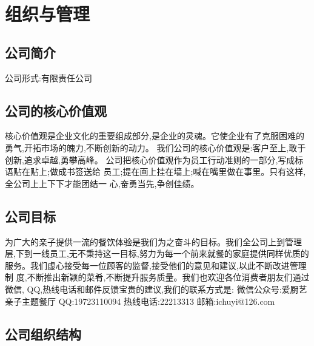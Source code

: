 \chapter{组织与管理}
\section{公司简介}
公司形式:有限责任公司
\section{公司的核心价值观}
核心价值观是企业文化的重要组成部分,是企业的灵魂。它使企业有了克服困难的
勇气,开拓市场的魄力,不断创新的动力。
我们公司的核心价值观是:客户至上,敢于创新,追求卓越,勇攀高峰。
公司把核心价值观作为员工行动准则的一部分,写成标语贴在贴上;做成书签送给
员工;提在画上挂在墙上;喊在嘴里做在事里。只有这样,全公司上上下下才能团结一
心,奋勇当先,争创佳绩。
\section{公司目标}
为广大的亲子提供一流的餐饮体验是我们为之奋斗的目标。我们全公司上到管理
层,下到一线员工,无不秉持这一目标,努力为每一个前来就餐的家庭提供同样优质的
服务。我们虚心接受每一位顾客的监督,接受他们的意见和建议,以此不断改进管理制
度,不断推出新颖的菜肴,不断提升服务质量。我们也欢迎各位消费者朋友们通过微信,
QQ,热线电话和邮件反馈宝贵的建议,我们的联系方式是:
微信公众号:爱厨艺亲子主题餐厅
QQ:19723110094
热线电话:22213313
邮箱:ichuyi@126.com

\section{公司组织结构}

